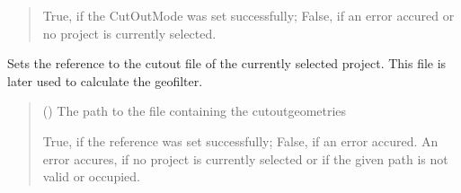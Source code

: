 \documentclass[letterpaper,10pt,english]{sphinxmanual}
\begin{document}
\begin{fulllineitems}
\begin{fulllineitems}
\begin{quote}
\begin{description}
\sphinxAtStartPar
True, if the CutOutMode was set successfully; False, if an error accured or no project is currently selected.

\sphinxAtStartPar
{}

\end{description}\end{quote}

\end{fulllineitems}


\begin{fulllineitems}
\label{\detokenize{apidoc/src.osm_configurator.control:src.osm_configurator.control.control_interface.IControl.set_cut_out_reference}}
\pysigstartsignatures
{}
\pysigstopsignatures
\sphinxAtStartPar
Sets the reference to the cut\sphinxhyphen{}out file of the currently selected project.
This file is later used to calculate the geofilter.
\begin{quote}\begin{description}
\sphinxAtStartPar
{} () \textendash{} The path to the file containing the cut\sphinxhyphen{}out\sphinxhyphen{}geometries

\sphinxAtStartPar
True, if the reference was set successfully; False, if an error accured. An error accures, if no project is currently selected or if the given path is not valid or occupied.

\sphinxAtStartPar
{}

\end{description}\end{quote}

\end{fulllineitems}



\end{fulllineitems}
\end{document}
